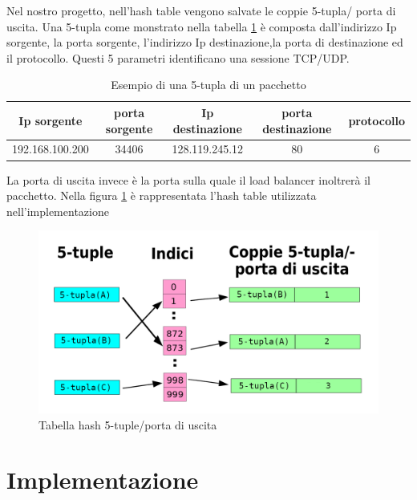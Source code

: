\documentclass[binding=0.6cm]{sapthesis}
\theoremstyle{definition}
\begin{document}
Nel nostro progetto, nell'hash table vengono salvate le coppie 5-tupla/ porta di uscita.
Una 5-tupla come monstrato nella tabella \ref{tab:5-tupla} è composta dall'indirizzo Ip sorgente,
la porta sorgente, l'indirizzo Ip destinazione,la porta di destinazione ed il protocollo.
Questi 5 parametri identificano una sessione TCP/UDP.


\begin{table}[H]
    
    \caption{Esempio di una 5-tupla di un pacchetto}
    \footnotesize
    \begin{tabular}{|c |c |c |c|c|} 
     \hline
     \textbf{Ip sorgente} & \textbf{porta sorgente} & \textbf{Ip destinazione} & \textbf{porta destinazione} & \textbf{protocollo} \\ 
     \hline
     192.168.100.200 & 34406 & 128.119.245.12 & 80 & 6\\ 
     \hline
    \end{tabular}
    \label{tab:5-tupla}
    

\end{table}
La porta di uscita invece è la porta sulla quale il load balancer inoltrerà il pacchetto.
Nella figura \ref{fig:hash-table-5-tuple} è rappresentata l'hash table utilizzata 
nell'implementazione
\begin{figure}[h]
    \centering
    \includegraphics[scale=0.24]{hash-table-5-tuple.png}
    \caption{Tabella hash 5-tuple/porta di uscita}
    \label{fig:hash-table-5-tuple}
\end{figure}

\section{Implementazione}
\label{chapter:implementazione}
\end{document}
